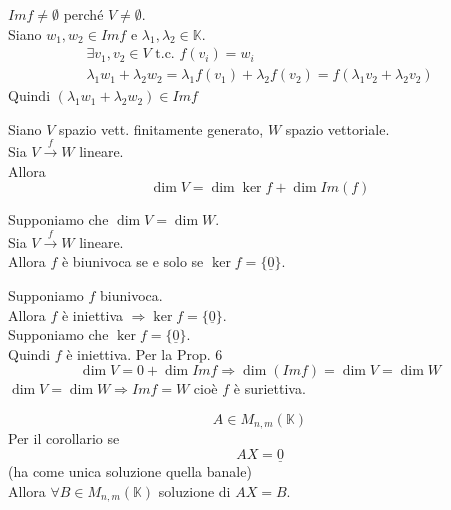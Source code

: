 \begin{dimostrazione}[]
    $Im f\not =\emptyset$ perché $V\not= \emptyset$. \\
    Siano $w_1,w_2\in Im f$ e $\lambda_1,\lambda_2\in \mathbb{K}$. \\
    \begin{gather}
        \exists v_1,v_2\in V \text{ t.c. } f(v_i)=w_i \\
        \lambda_1w_1+\lambda_2w_2=\lambda_1 f(v_1)+\lambda_2f(v_2)=f(\lambda_1 v_2+\lambda_2v_2)
    \end{gather}
    Quindi $(\lambda_1w_1+\lambda_2w_2)\in Im f$
\end{dimostrazione}
\begin{proposizione}
    Siano $V$ spazio vett. finitamente generato, $W$ spazio vettoriale. \\
    Sia $V\xrightarrow{f} W$ lineare. \\
    Allora
    \begin{equation}
        \dim V=\dim\ker f+\dim Im(f)
    \end{equation}
\end{proposizione}
\begin{corollario}
    Supponiamo che $\dim V=\dim W$. \\
    Sia $V\xrightarrow{f} W$ lineare. \\
    Allora $f$ è biunivoca se e solo se $\ker f=\{\underline{0}\}$.
\end{corollario}
\begin{dimostrazione}
    Supponiamo $f$ biunivoca. \\
    Allora $f$ è iniettiva $\Rightarrow \ker f=\{\underline{0}\}$. \\
    Supponiamo che $\ker f=\{\underline{0}\}$. \\
    Quindi $f$ è iniettiva. Per la Prop. 6
    \begin{equation}
        \dim V=0+\dim Im f\Rightarrow \dim(Im f)=\dim V = \dim W
    \end{equation}
    $\dim V=\dim W \Rightarrow Im f=W$ cioè $f$ è suriettiva.
\end{dimostrazione}
\begin{esempio}[]
    \begin{equation}
        A\in M _{n,m}(\mathbb{K})
    \end{equation}
    Per il corollario se
    \begin{equation}
        A X=\underline{0}
    \end{equation}
    (ha come unica soluzione quella banale) \\
    Allora $\forall B\in M _{n,m}(\mathbb{K})$ soluzione di $AX=B$.
\end{esempio}



